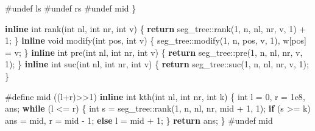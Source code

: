 \documentclass[
]{article}
\newenvironment{Shaded}{}{}
\newcommand{\ControlFlowTok}[1]{\textcolor[rgb]{0.00,0.44,0.13}{\textbf{#1}}}
\newcommand{\DataTypeTok}[1]{\textcolor[rgb]{0.56,0.13,0.00}{#1}}
\newcommand{\DecValTok}[1]{\textcolor[rgb]{0.25,0.63,0.44}{#1}}
\newcommand{\FloatTok}[1]{\textcolor[rgb]{0.25,0.63,0.44}{#1}}
\newcommand{\KeywordTok}[1]{\textcolor[rgb]{0.00,0.44,0.13}{\textbf{#1}}}
\newcommand{\NormalTok}[1]{#1}
\newcommand{\PreprocessorTok}[1]{\textcolor[rgb]{0.74,0.48,0.00}{#1}}
\begin{document}
\begin{Shaded}
\begin{Highlighting}[]
\PreprocessorTok{\#undef ls}
\PreprocessorTok{\#undef rs}
\PreprocessorTok{\#undef mid}
\NormalTok{\}}

\KeywordTok{inline} \DataTypeTok{int}\NormalTok{  rank(}\DataTypeTok{int}\NormalTok{ nl, }\DataTypeTok{int}\NormalTok{ nr, }\DataTypeTok{int}\NormalTok{ v) \{ }\ControlFlowTok{return}\NormalTok{ seg\_tree::rank(}\DecValTok{1}\NormalTok{, n, nl, nr, v, }\DecValTok{1}\NormalTok{) + }\DecValTok{1}\NormalTok{; \}}
\KeywordTok{inline} \DataTypeTok{void}\NormalTok{ modify(}\DataTypeTok{int}\NormalTok{ pos, }\DataTypeTok{int}\NormalTok{ v) \{ seg\_tree::modify(}\DecValTok{1}\NormalTok{, n, pos, v, }\DecValTok{1}\NormalTok{), w[pos] = v; \}}
\KeywordTok{inline} \DataTypeTok{int}\NormalTok{  pre(}\DataTypeTok{int}\NormalTok{ nl, }\DataTypeTok{int}\NormalTok{ nr, }\DataTypeTok{int}\NormalTok{ v) \{ }\ControlFlowTok{return}\NormalTok{ seg\_tree::pre(}\DecValTok{1}\NormalTok{, n, nl, nr, v, }\DecValTok{1}\NormalTok{); \}}
\KeywordTok{inline} \DataTypeTok{int}\NormalTok{  suc(}\DataTypeTok{int}\NormalTok{ nl, }\DataTypeTok{int}\NormalTok{ nr, }\DataTypeTok{int}\NormalTok{ v) \{ }\ControlFlowTok{return}\NormalTok{ seg\_tree::suc(}\DecValTok{1}\NormalTok{, n, nl, nr, v, }\DecValTok{1}\NormalTok{); \}}

\PreprocessorTok{\#define mid }\NormalTok{((l+r)\textgreater{}\textgreater{}}\DecValTok{1}\NormalTok{)}
\KeywordTok{inline} \DataTypeTok{int}\NormalTok{  kth(}\DataTypeTok{int}\NormalTok{ nl, }\DataTypeTok{int}\NormalTok{ nr, }\DataTypeTok{int}\NormalTok{ k)}
\NormalTok{\{}
    \DataTypeTok{int}\NormalTok{ l = }\DecValTok{0}\NormalTok{, r = }\FloatTok{1e8}\NormalTok{, ans;}
    \ControlFlowTok{while}\NormalTok{ (l \textless{}= r)}
\NormalTok{    \{}
        \DataTypeTok{int}\NormalTok{ s = seg\_tree::rank(}\DecValTok{1}\NormalTok{, n, nl, nr, mid + }\DecValTok{1}\NormalTok{, }\DecValTok{1}\NormalTok{);}
        \ControlFlowTok{if}\NormalTok{ (s \textgreater{}= k) ans = mid, r = mid {-} }\DecValTok{1}\NormalTok{;}
        \ControlFlowTok{else}\NormalTok{ l = mid + }\DecValTok{1}\NormalTok{;}
\NormalTok{    \}}
    \ControlFlowTok{return}\NormalTok{ ans;}
\NormalTok{\}}
\PreprocessorTok{\#undef mid}


\end{Highlighting}
\end{Shaded}
\end{document}
